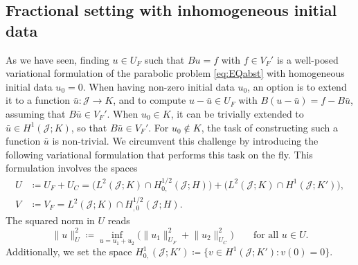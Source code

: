 \documentclass{amsart}
\newcommand{\cJ}{\mathcal J}
\begin{document}
\subsection{Fractional setting with inhomogeneous initial data}\label{subsec:MixedProb}
%
As we have seen, finding $u \in U_F$ such that $B u=f$ with $f \in V_F'$ is a well-posed variational formulation of the parabolic problem \eqref{eq:EQabst} with homogeneous initial data $u_0=0$.
When having non-zero initial data $u_0$, an option is to extend it to a function $\bar{u}\colon \cJ \rightarrow K$, and to compute $u-\bar{u} \in U_F$ with $B (u-\bar{u})=f - B \bar{u}$, assuming that $B\bar{u} \in V_F'$. When $u_0 \in K$, it can be trivially extended to $\bar{u} \in H^1(\cJ;K)$, so that $B\bar{u} \in V_F'$.
For $u_0 \not\in K$, the task of constructing such a function $\bar{u}$ is non-trivial. We circumvent this challenge by introducing the following variational formulation that performs this task on the fly.
This formulation involves the spaces 
\begin{align*}
U & \coloneqq U_F + U_C = \big(L^2(\cJ;K) \cap H_{0,}^{1/2}(\cJ;H)\big) + \big(L^2(\cJ;K) \cap H^{1}(\cJ;K')\big),\\
V & \coloneqq V_F = L^2(\cJ;K) \cap H^{1/2}_{,0}(\cJ;H).
\end{align*}
The squared norm in $U$ reads 
\begin{equation*}
\lVert u \rVert_U^2 \coloneqq \inf_{u = u_1 + u_2} \big(\lVert u_1 \rVert_{U_F}^2 + \lVert u_2 \rVert_{U_C}^2\big) \qquad\text{for all }u\in U.
\end{equation*}
Additionally, we set the space $H^1_{0,}(\cJ;K') \coloneqq \lbrace v \in H^1(\cJ;K') \colon v(0) = 0\rbrace$. 
\end{document}
